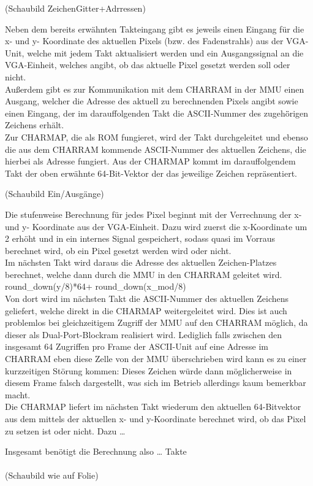 (Schaubild ZeichenGitter+Adrressen)


Neben dem bereits erw\"ahnten Takteingang gibt es jeweils einen Eingang f\"ur die x- und y- Koordinate des aktuellen Pixels (bzw. des Fadenstrahls) aus der VGA-Unit, welche mit jedem Takt aktualisiert werden und ein Ausgangssignal an die VGA-Einheit, welches angibt, ob das aktuelle Pixel gesetzt werden soll oder nicht.\\ Au{\ss}erdem gibt es zur Kommunikation mit dem CHARRAM in der MMU einen Ausgang, welcher die Adresse des aktuell zu berechnenden Pixels angibt sowie einen Eingang, der im darauffolgenden Takt die ASCII-Nummer des zugeh\"örigen Zeichens erh\"alt.\\
Zur CHARMAP, die als ROM fungieret, wird der Takt durchgeleitet und ebenso die aus dem CHARRAM kommende ASCII-Nummer des aktuellen Zeichens, die hierbei als Adresse fungiert. Aus der CHARMAP kommt im darauffolgendem Takt der oben erw\"ahnte 64-Bit-Vektor der das jeweilige Zeichen repr\"asentiert.



(Schaubild Ein/Ausgänge)

Die stufenweise Berechnung f\"ur jedes Pixel beginnt mit der Verrechnung der x- und y- Koordinate aus der VGA-Einheit. Dazu wird zuerst die x-Koordinate um 2 erh\"oht und in ein internes Signal gespeichert, sodass quasi im Vorraus berechnet wird, ob ein Pixel gesetzt werden wird oder nicht.\\
Im n\"achsten Takt wird daraus die Adresse des aktuellen Zeichen-Platzes berechnet, welche dann durch die MMU in den CHARRAM geleitet wird.  round\_down(y/8)*64+ round\_down(x\_mod/8)\\
Von dort wird im n\"achsten Takt die ASCII-Nummer des aktuellen Zeichens geliefert, welche direkt in die CHARMAP weitergeleitet wird. Dies ist auch problemlos bei gleichzeitigem Zugriff der MMU auf den CHARRAM m\"oglich, da dieser als Dual-Port-Blockram realisiert wird. Lediglich falls zwischen den insgesamt 64 Zugriffen pro Frame der ASCII-Unit auf eine Adresse im CHARRAM eben diese Zelle von der MMU \"uberschrieben wird kann es zu einer kurzzeitigen St\"orung kommen: Dieses Zeichen w\"urde dann m\"oglicherweise in diesem Frame falsch dargestellt, was sich im Betrieb allerdings kaum bemerkbar macht.\\
Die CHARMAP liefert im n\"achsten Takt wiederum den aktuellen 64-Bitvektor aus dem mittels der aktuellen x- und y-Koordinate berechnet wird, ob das Pixel zu setzen ist oder nicht. Dazu …

Insgesamt ben\"otigt die Berechnung also … Takte
\\\\
(Schaubild wie auf Folie)
